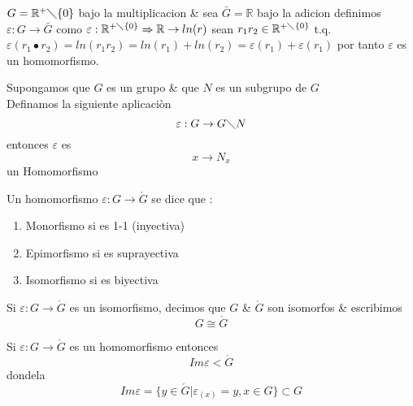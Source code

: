 	\begin{ejemplo}
	$G=\mathbb{R} ^{+}\diagdown \{ 0\} $ 
	bajo la multiplicacion \& sea
	 $\bar{G}=\mathbb{R}   $ 
	 bajo la adicion definimos $\varepsilon :G \rightarrow \bar{G} $
	  como
	   $ \varepsilon :\mathbb{R} ^{+\diagdown \{ 0\} } \Rightarrow \mathbb{R} \rightarrow ln(r)$ 
	   sean 
	   $r_{1}r_{2}\in\mathbb{R} ^{+\diagdown \{ 0\} }$ 
	   t.q.
	    $\varepsilon (r_{1}\bullet r_{2})=ln(r_{1}r_{2})=ln(r_{1})+ln(r_{2})=\varepsilon (r_{1})+\varepsilon (r_{1})$ 
	    por tanto $\varepsilon $ es un homomorfismo.
	    \end{ejemplo}
	  \begin{lema}
	  Supongamos que $G$ es un grupo \&  que $N$ es un subgrupo de $G$ \\
	  Definamos la siguiente aplicaci\`on 
	  \begin{equation}
	    \varepsilon :G\rightarrow G\diagdown N \nonumber
	  \end{equation}
	  entonces $\varepsilon $ es 
	  \begin{equation}
	    x\rightarrow N_{x}
	  \end{equation}
	  un Homomorfismo
	  \end{lema}
	  \begin{definicion}
	  Un homomorfismo
      $\varepsilon :G\rightarrow \acute{G} $     
	  se dice que :
	  \begin{enumerate}[a]
	    \item Monorfismo si es 1-1 (inyectiva)
	    \item Epimorfismo si es suprayectiva
	    \item Isomorfismo si es biyectiva
	  \end{enumerate}
	  \end{definicion}
	  \begin{definicion}
	  Si $\varepsilon :G\rightarrow \acute{G} $ es un isomorfismo, decimos que  $G$ \& $\acute{G} $ son isomorfos \& escribimos 
	  \begin{equation}
	    G\cong \acute{G}  
	  \end{equation}
	  \end{definicion}
	\begin{proposicion}
	Si $\varepsilon :G\rightarrow \acute{G} $ es un homomorfismo entonces 
	\begin{equation}
	  Im\varepsilon < \acute{G} 
	\end{equation}
	dondela
	\begin{equation}
    Im\varepsilon =\{ y\in \acute{G}| \varepsilon _{(x)}=y,x\in G\} \subset G 	
	\end{equation}
	\end{proposicion}
